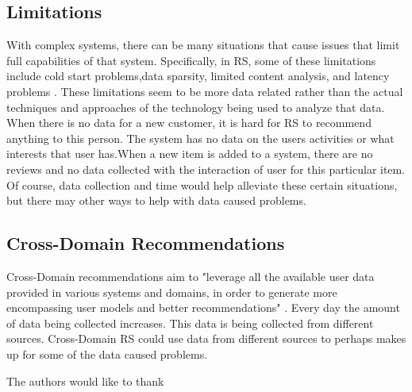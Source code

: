 \documentclass[sigconf]{acmart}
\begin{document}
\subsection{Limitations}
With complex systems, there can be many situations that cause issues that limit full capabilities of that system. Specifically, in RS, some of these limitations include cold start problems,data sparsity, limited content analysis, and latency problems \cite{Khusro2016}. These limitations seem to be more data related rather than the actual techniques and approaches of the technology being used to analyze that data. When there is no data for a new customer, it is hard for RS to recommend anything to this person. The system has no data on the users activities or what interests that user has.When a new item is added to a system, there are no reviews and no data collected with the interaction of user for this particular item. Of course, data collection and time would help alleviate these certain situations, but there may other ways to help with data caused problems.

\subsection{Cross-Domain Recommendations}
Cross-Domain recommendations aim to "leverage all the available user data provided in various systems and
domains, in order to generate more encompassing user models and better recommendations" \cite{Cantador2015}.
Every day the amount of data being collected increases. This data is being collected from different sources.
Cross-Domain RS could use data from different sources to perhaps makes up for some of the data caused
problems. 


\begin{acks}

  The authors would like to thank 

\end{acks}


 
\end{document}
